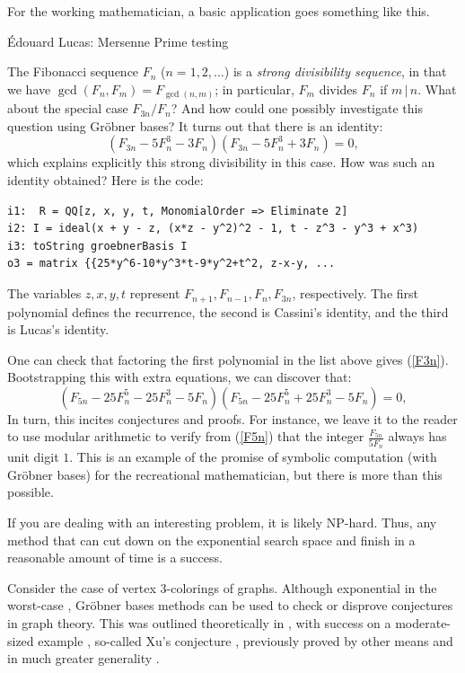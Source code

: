 
For the working mathematician, a basic application goes something like this.

\'Edouard Lucas: Mersenne Prime testing

The Fibonacci sequence $F_n$ ($n= 1, 2, \ldots$) is a \textit{strong divisibility sequence}, in that we have $\gcd(F_n, F_m) = F_{\gcd(n,m)}$; in particular, $F_m$ divides $F_n$ if $m \, | \, n$.  What about the special case $F_{3n}/F_n$?  And how could one possibly investigate this question using Gr\"obner bases?  It turns out that there is an identity:
\begin{equation}\label{F3n}
(F_{3n} - 5 F_n^3 - 3 F_n)(F_{3n} - 5 F_n^3 + 3 F_n) = 0,
\end{equation}
which explains explicitly this strong divisibility in this case.  How was such an identity obtained?  Here is the code:
\begin{M2}
\begin{verbatim}
i1:  R = QQ[z, x, y, t, MonomialOrder => Eliminate 2]
i2: I = ideal(x + y - z, (x*z - y^2)^2 - 1, t - z^3 - y^3 + x^3)
i3: toString groebnerBasis I
o3 = matrix {{25*y^6-10*y^3*t-9*y^2+t^2, z-x-y, ...
\end{verbatim}
\end{M2}  
\medskip
The variables $z,x,y,t$ represent $F_{n+1}, F_{n-1}, F_n, F_{3n}$, respectively.  The first polynomial defines the recurrence, the second is Cassini's identity, and the third is Lucas's identity.

One can check that factoring the first polynomial in the list above gives (\ref{F3n}).  Bootstrapping this with extra equations, we can discover that:
\begin{equation}\label{F5n}
(F_{5n} - 25 F_n^5 - 25 F_n^3 - 5 F_n)(F_{5n} - 25 F_n^5 + 25 F_n^3 - 5 F_n) = 0,
\end{equation}
In turn, this incites conjectures and proofs.  
For instance, we leave it to the reader to use modular arithmetic to verify from (\ref{F5n}) that the integer $\frac{F_{5n}}{5F_n}$ always has unit digit $1$.  This is an example of the promise of symbolic computation (with Gr\"obner bases) for the recreational mathematician, but there is more than this possible.

If you are dealing with an interesting problem, it is likely NP-hard.  Thus, any method that can cut down on the exponential search space and finish in a reasonable amount of time is a success.  

Consider the case of vertex 3-colorings of graphs.  Although exponential in the worst-case \cite[pp. 400]{yap2000fundamental}, Gr\"obner bases methods can be used to check or disprove conjectures in graph theory.  This was outlined theoretically in \cite{bayer1982division}, with success on a moderate-sized example \cite{hillar2008algebraic}, so-called Xu's conjecture \cite{shaoji1990size}, previously proved by other means and in much greater generality \cite{akbari2001kr}.

